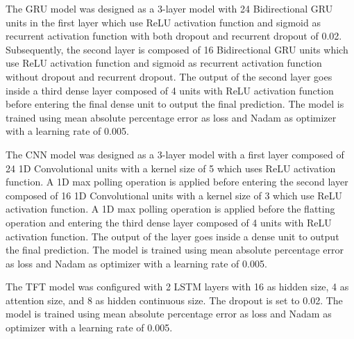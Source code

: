 The GRU model was designed as a 3-layer model with 24 Bidirectional GRU units in the first layer which use ReLU activation function and sigmoid as recurrent activation function with both dropout and recurrent dropout of 0.02.
Subsequently, the second layer is composed of 16 Bidirectional GRU units which use ReLU activation function and sigmoid as recurrent activation function without dropout and recurrent dropout.
The output of the second layer goes inside a third dense layer composed of 4 units with ReLU activation function before entering the final dense unit to output the final prediction.
The model is trained using mean absolute percentage error as loss and Nadam as optimizer with a learning rate of 0.005.

The CNN model was designed as a 3-layer model with a first layer composed of 24 1D Convolutional units with a kernel size of 5 which uses ReLU activation function.
A 1D max polling operation is applied before entering the second layer composed of 16 1D Convolutional units with a kernel size of 3 which use ReLU activation function.
A 1D max polling operation is applied before the flatting operation and entering the third dense layer composed of 4 units with ReLU activation function.
The output of the layer goes inside a dense unit to output the final prediction.
The model is trained using mean absolute percentage error as loss and Nadam as optimizer with a learning rate of 0.005.

The TFT model was configured with 2 LSTM layers with 16 as hidden size, 4 as attention size, and 8 as hidden continuous size.
The dropout is set to 0.02.
The model is trained using mean absolute percentage error as loss and Nadam as optimizer with a learning rate of 0.005.

